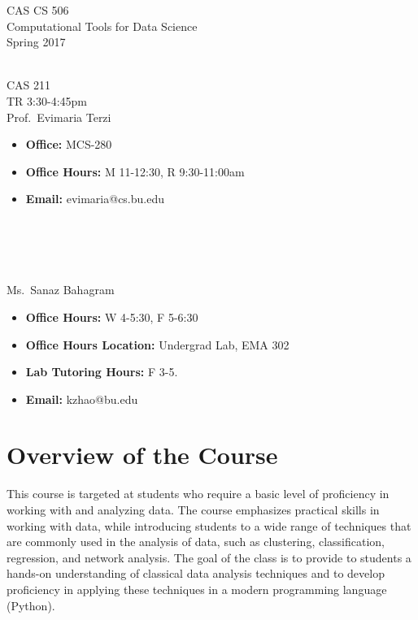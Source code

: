 \documentclass[11pt]{article}
\begin{document}
\sloppy 
\begin{center}
\LARGE CAS CS 506\\
\Large Computational Tools for Data Science\\
\Large\rm Spring 2017\\~\\
\end{center}

 CAS 211\\[\baselineskip]
 TR 3:30-4:45pm
\\[\baselineskip] 

 Prof.\ Evimaria Terzi\\[0.75\baselineskip]
\begin{minipage}[t]{0.60\textwidth}
\begin{itemize}
\item {\bf Office:} MCS-280
\item {\bf Office Hours:} {\small M 11-12:30, R 9:30-11:00am}
\item {\bf Email:} evimaria@cs.bu.edu
\end{itemize}
\end{minipage}
~\\~\\~\\~\\
  Ms.\ Sanaz Bahagram\\[0.75\baselineskip]
 \begin{minipage}[t]{0.60\textwidth}
 \begin{itemize}
 \item {\bf Office Hours:} {\small W 4-5:30, F 5-6:30}
 \item {\bf Office Hours Location:} Undergrad Lab, EMA 302
 \item {\bf Lab Tutoring Hours:} {\small F 3-5.}
 \item {\bf Email:} kzhao@bu.edu
 \end{itemize}
 \end{minipage}

\section*{Overview of the Course}

This course is targeted at students who require a basic level of
proficiency in working with and analyzing data.  The course emphasizes
practical skills in working with data, while introducing students to a
wide range of techniques that are commonly used in the analysis of data,
such as clustering, classification, regression, and network analysis.
The goal of the class is to provide to students a hands-on understanding
of classical data analysis techniques and to develop proficiency in
applying these techniques in a modern programming language (Python). 
\end{document}
